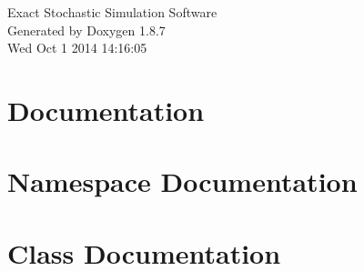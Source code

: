 \documentclass[twoside]{book}
\newcommand{\+}{\discretionary{\mbox{\scriptsize$\hookleftarrow$}}{}{}}
\newcommand{\clearemptydoublepage}{%
  \newpage{\pagestyle{empty}\cleardoublepage}%
}
\begin{document}
\hypersetup{pageanchor=false,
             bookmarks=true,
             bookmarksnumbered=true,
             pdfencoding=unicode
            }
\begin{titlepage}
\vspace*{7cm}
\begin{center}%
{\Large Exact Stochastic Simulation Software }\\
\vspace*{1cm}
{\large Generated by Doxygen 1.8.7}\\
\vspace*{0.5cm}
{\small Wed Oct 1 2014 14:16:05}\\
\end{center}
\end{titlepage}
\clearemptydoublepage
\tableofcontents
\clearemptydoublepage
{}
\hypersetup{pageanchor=true}

\chapter{Documentation}
\label{index}\hypertarget{index}{}
\chapter{Namespace Documentation}

\chapter{Class Documentation}



























\end{document}
